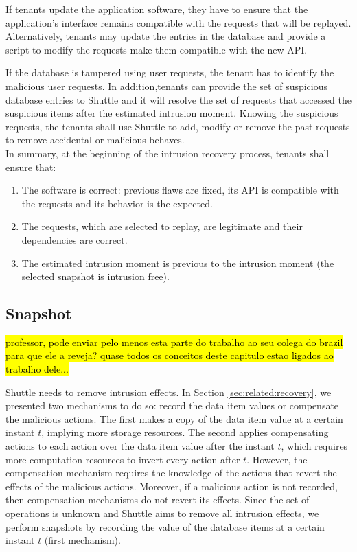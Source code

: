 If tenants update the application software, they have to ensure that the application's interface remains compatible with the requests that will be replayed. Alternatively, tenants may update the entries in the database and provide a script to modify the requests make them compatible with the new \ac{API}. 

If the database is tampered using user requests, the tenant has to identify the malicious user requests. In addition,tenants can provide the set of suspicious database entries to Shuttle and it will resolve the set of requests that accessed the suspicious items after the estimated intrusion moment. Knowing the suspicious requests, the tenants shall use Shuttle to add, modify or remove the past requests to remove accidental or malicious behaves. \\

In summary, at the beginning of the intrusion recovery process, tenants shall ensure that:
\begin{enumerate}
    \item The software is correct: previous flaws are fixed, its \ac{API} is compatible with the requests and its behavior is the expected.
    \item The requests, which are selected to replay, are legitimate and their dependencies are correct.
    \item The estimated intrusion moment is previous to the intrusion moment (the selected snapshot is intrusion free).
\end{enumerate} 


\subsection{Snapshot}
\label{sec:arch:snapshot}
\hl{professor, pode enviar pelo menos esta parte do trabalho ao seu colega do brazil para que ele a reveja? quase todos os conceitos deste capitulo estao ligados ao trabalho dele...}

Shuttle needs to remove intrusion effects. In Section \ref{sec:related:recovery}, we presented two mechanisms to do so: record the data item values or compensate the malicious actions. The first makes a copy of the data item value at a certain instant $t$, implying more storage resources. The second applies compensating actions to each action over the data item value after the instant $t$, which requires more computation resources to invert every action after $t$. However, the compensation mechanism requires the knowledge of the actions that revert the effects of the malicious actions. Moreover, if a malicious action is not recorded, then compensation mechanisms do not revert its effects. Since the set of operations is unknown and Shuttle aims to remove all intrusion effects, we perform snapshots by recording the value of the database items at a certain instant $t$ (first mechanism).\\

